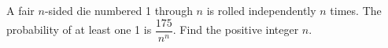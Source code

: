 A fair $ n $-sided die numbered 1 through $ n $ is rolled independently $ n $ times. The probability of at least one 1 is $\dfrac{175}{n^n}$. Find the positive integer $ n $.
